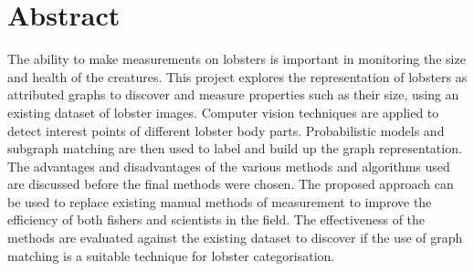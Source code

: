 \section*{Abstract}
The ability to make measurements on lobsters is important in monitoring the size and health of the creatures.
This project explores the representation of lobsters as attributed graphs to discover and measure properties such as their size, using an existing dataset of lobster images.
Computer vision techniques are applied to detect interest points of different lobster body parts. 
Probabilistic models and subgraph matching are then used to label and build up the graph representation.
The advantages and disadvantages of the various methods and algorithms used are discussed before the final methods were chosen. 
The proposed approach can be used to replace existing manual methods of measurement to improve the efficiency of both fishers and scientists in the field. 
The effectiveness of the methods are evaluated against the existing dataset to discover if the use of graph matching is a suitable technique for lobster categorisation. 


